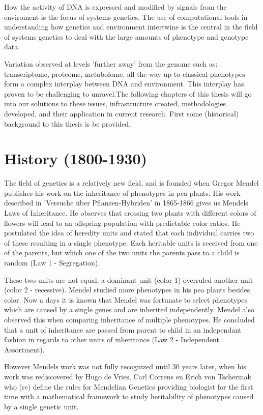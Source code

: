 How the activity of DNA is expressed and modified by signals from the enviroment is the 
focus of systems genetics. The use of computational tools in understanding how genetics 
and environment intertwine is the central in the field of systems genetics to deal with the 
large amounts of phenotype and genotype data.

Variation observed at levels 'further away' from the genome such as: transcriptome, 
proteome, metabolome, all the way up to classical phenotypes form a complex interplay 
between DNA and environment. This interplay has proven to be challenging to unravel.The 
following chapters of this thesis will go into our solutions to these issues, 
infrastructure created, methodologies developed, and their application in current 
research. First some (historical) background to this thesis is be provided.

\section{History (1800-1930)}

The field of genetics is a relatively new field, and is founded when Gregor 
Mendel publishes his work on the inheritance of phenotypes in pea plants. 
His work described in 'Versuche \"uber Pflanzen-Hybriden' in 1865-1866 
\cite{Mendel:1866} gives us Mendels Laws of Inheritance. He observes that 
crossing two plants with different colors of flowers will lead to an offspring 
population with predictable color ratios. He postulated the idea of heredity 
units and stated that each individual carries two of these resulting in a 
single phenotype. Each heritable units is received from one of the parents, 
but which one of the two units the parents pass to a child is random 
(Law 1 - Segregation).

These two units are not equal, a dominant unit (color 1) overruled another 
unit (color 2 - recessive). Mendel studied more phenotypes in his pea plants 
besides color. Now a days it is known that Mendel was fortunate to select 
phenotypes which are caused by a single genes and are inherited independently. 
Mendel also observed this when comparing inheritance of multiple phenotypes. 
He concluded that a unit of inheritance are passed from parent to child in an 
independant fashion in regards to other units of inheritance 
(Law 2 - Independent Assortment).

However Mendels work was not fully recognized until 30 years later, when his work was 
rediscovered by Hugo de Vries, Carl Correns en Erich von Tschermak who (re) define the 
rules for Mendelian Genetics \cite{deVries:1889} providing biologist for the first 
time with a mathematical framework to study heritability of phenotypes caused by a 
single genetic unit.

